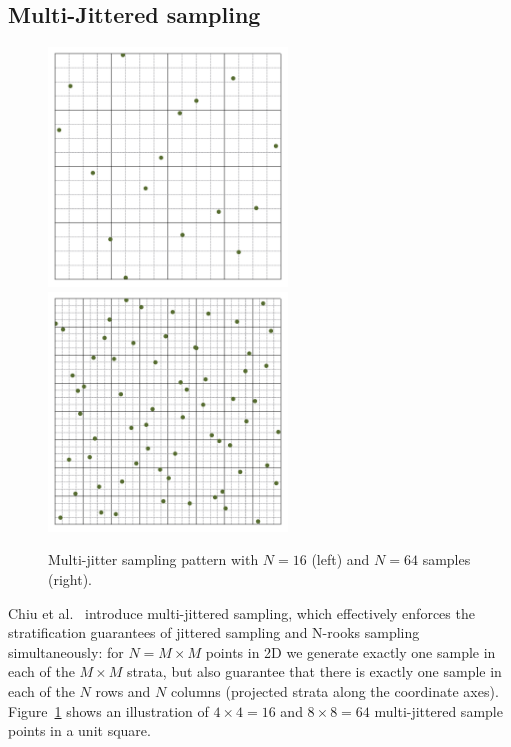 \documentclass[11pt,fleqn]{book} %
\begin{document}
\subsection{Multi-Jittered sampling}
%
\begin{figure}[ht]
  \centering
  \includegraphics[width=2.5in]{Pictures/pointset-gridvisualize/points-multijitter-n16.pdf}
    \includegraphics[width=2.5in]{./Pictures/pointset-gridvisualize/points-multijitter-n64.pdf}
  \caption{Multi-jitter sampling pattern with $N=16$ (left) and $N = 64$ samples (right).}
  \label{fig:multijitter}
\end{figure}
%
Chiu et al.~\cite{chiu94multi} introduce multi-jittered sampling, which effectively enforces the stratification guarantees of jittered sampling and N-rooks sampling simultaneously: for $N=M\times M$ points in 2D we generate exactly one sample in each of the $M\times M$ strata, but also guarantee that there is exactly one sample in each of the $N$ rows and $N$ columns (projected strata along the coordinate axes). Figure~\ref{fig:multijitter} shows an illustration of  $4\times4 = 16$ and $8\times8 = 64$  multi-jittered sample points in a unit square.
%

%
\end{document}
